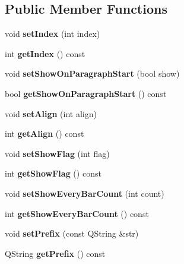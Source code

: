 \subsection*{Public Member Functions}
\begin{DoxyCompactItemize}
\item 
\mbox{\label{class_o_v_e_1_1_bar_number_abbdc927047b5bfb5aa3c8d9234deb960}} 
void {\bfseries set\+Index} (int index)
\item 
\mbox{\label{class_o_v_e_1_1_bar_number_aa5f402d9f4abf4a963cf0d49d93b7e59}} 
int {\bfseries get\+Index} () const
\item 
\mbox{\label{class_o_v_e_1_1_bar_number_acbc409e26ff7d6d94d5ebfba00269812}} 
void {\bfseries set\+Show\+On\+Paragraph\+Start} (bool show)
\item 
\mbox{\label{class_o_v_e_1_1_bar_number_ad13a2006ab7b19dc1e28a6c71224b4de}} 
bool {\bfseries get\+Show\+On\+Paragraph\+Start} () const
\item 
\mbox{\label{class_o_v_e_1_1_bar_number_aa2f391dd122fb5be6f9e0114e3457415}} 
void {\bfseries set\+Align} (int align)
\item 
\mbox{\label{class_o_v_e_1_1_bar_number_a841abbb5519c2ead7482b4a31581451e}} 
int {\bfseries get\+Align} () const
\item 
\mbox{\label{class_o_v_e_1_1_bar_number_a995208e416902a0213cd14ae31cba68e}} 
void {\bfseries set\+Show\+Flag} (int flag)
\item 
\mbox{\label{class_o_v_e_1_1_bar_number_a3392da8deb8998f5a23b5df9ecec54fc}} 
int {\bfseries get\+Show\+Flag} () const
\item 
\mbox{\label{class_o_v_e_1_1_bar_number_a1a8d4fa7ae302f016120a40148b2e175}} 
void {\bfseries set\+Show\+Every\+Bar\+Count} (int count)
\item 
\mbox{\label{class_o_v_e_1_1_bar_number_acd61ad51e53a2d8f0ba267cbecbcc34e}} 
int {\bfseries get\+Show\+Every\+Bar\+Count} () const
\item 
\mbox{\label{class_o_v_e_1_1_bar_number_ac45654410bb44c15aaf31b3123bd2c02}} 
void {\bfseries set\+Prefix} (const Q\+String \&str)
\item 
\mbox{\label{class_o_v_e_1_1_bar_number_ae6304f4e5414c6f32dcc2ac321cdaafb}} 
Q\+String {\bfseries get\+Prefix} () const
\end{DoxyCompactItemize}
